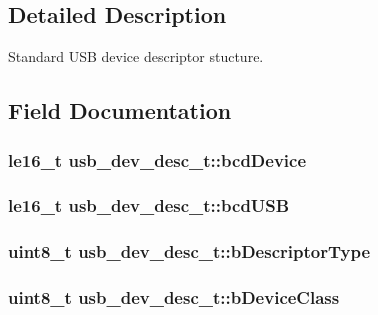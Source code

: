 \subsection{\-Detailed \-Description}
\-Standard \-U\-S\-B device descriptor stucture. 

\subsection{\-Field \-Documentation}
\hypertarget{structusb__dev__desc__t_ace438955df22cd6527b8f1d543c41aed}{
\subsubsection[{bcd\-Device}]{\setlength{\rightskip}{0pt plus 5cm}le16\-\_\-t {\bf usb\-\_\-dev\-\_\-desc\-\_\-t\-::bcd\-Device}}}
\label{structusb__dev__desc__t_ace438955df22cd6527b8f1d543c41aed}
\hypertarget{structusb__dev__desc__t_a45f7d74df9688a10a41a69de613d0191}{
\subsubsection[{bcd\-U\-S\-B}]{\setlength{\rightskip}{0pt plus 5cm}le16\-\_\-t {\bf usb\-\_\-dev\-\_\-desc\-\_\-t\-::bcd\-U\-S\-B}}}
\label{structusb__dev__desc__t_a45f7d74df9688a10a41a69de613d0191}
\hypertarget{structusb__dev__desc__t_a840d4136b9b6662fb2bab49053949c1b}{
\subsubsection[{b\-Descriptor\-Type}]{\setlength{\rightskip}{0pt plus 5cm}uint8\-\_\-t {\bf usb\-\_\-dev\-\_\-desc\-\_\-t\-::b\-Descriptor\-Type}}}
\label{structusb__dev__desc__t_a840d4136b9b6662fb2bab49053949c1b}
\hypertarget{structusb__dev__desc__t_a64f6606c681beb18f1d13d701d1264c2}{
\subsubsection[{b\-Device\-Class}]{\setlength{\rightskip}{0pt plus 5cm}uint8\-\_\-t {\bf usb\-\_\-dev\-\_\-desc\-\_\-t\-::b\-Device\-Class}}}
